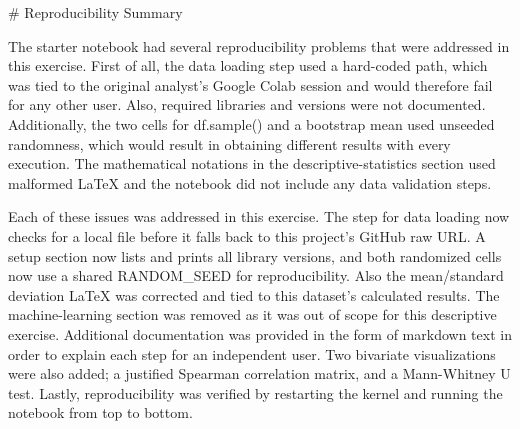 # Reproducibility Summary

The starter notebook had several reproducibility problems that were addressed in this exercise. 
First of all, the data loading step used a hard-coded path, which was tied to the original 
analyst's Google Colab session and would therefore fail for any other user. Also, required libraries
and versions were not documented. Additionally, the two cells for df.sample() and a bootstrap mean used 
unseeded randomness, which would result in obtaining different results with every execution. The 
mathematical notations in the descriptive-statistics section used malformed LaTeX and the notebook 
did not include any data validation steps. 

Each of these issues was addressed in this exercise. The step for data loading now checks for a local file 
before it falls back to this project's GitHub raw URL. A setup section now lists and prints all library versions, 
and both randomized cells now use a shared RANDOM_SEED for reproducibility. Also the mean/standard deviation 
LaTeX was corrected and tied to this dataset's calculated results. The machine-learning section was removed as
it was out of scope for this descriptive exercise. Additional documentation was provided in the form of markdown
text in order to explain each step for an independent user. Two bivariate visualizations were also added; a justified
Spearman correlation matrix, and a Mann-Whitney U test. Lastly, reproducibility was verified by restarting the 
kernel and running the notebook from top to bottom.
